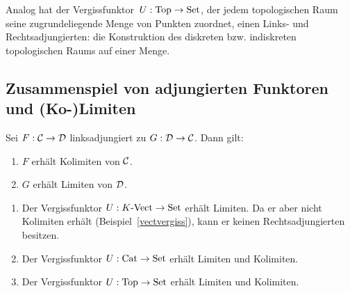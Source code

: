 \begin{bsp}Analog hat der Vergissfunktor~$U : \mathrm{Top} \to \mathrm{Set}$, der jedem
topologischen Raum seine zugrundeliegende Menge von Punkten zuordnet, einen
Links- und Rechtsadjungierten: die Konstruktion des diskreten bzw. indiskreten
topologischen Raums auf einer Menge.\end{bsp}


\subsection{Zusammenspiel von adjungierten Funktoren und (Ko-)Limiten}

\begin{prop}
Sei $F:\mathcal{C}\to\mathcal{D}$ linksadjungiert zu $G:\mathcal{D}\to\mathcal{C}$. Dann gilt:
\begin{enumerate}
\item $F$ erhält Kolimiten von $\mathcal{C}$.
\item $G$ erhält Limiten von $\mathcal{D}$.
\end{enumerate}
\end{prop}

\begin{kor}\label{vergissstetig}
\begin{enumerate}
\item Der Vergissfunktor $U:{K\text{-}\mathrm{Vect}} \to \mathrm{Set}$ erhält Limiten.
Da er aber nicht Kolimiten erhält (Beispiel~\ref{vectvergiss}), kann er keinen
Rechtsadjungierten besitzen.
\item \label{vergisscat}Der Vergissfunktor $U:\mathrm{Cat} \to \mathrm{Set}$ erhält Limiten und Kolimiten.
\item Der Vergissfunktor $U:\mathrm{Top} \to \mathrm{Set}$ erhält Limiten und Kolimiten.
\end{enumerate}
\end{kor}

